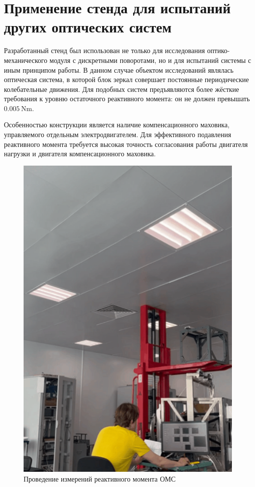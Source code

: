  \section{Применение стенда для испытаний других оптических систем}
 
 Разработанный стенд был использован не только для исследования оптико-механического модуля с дискретными поворотами, но и для испытаний системы с иным принципом работы. В данном случае объектом исследований являлась оптическая система, в которой блок зеркал совершает постоянные периодические колебательные движения. Для подобных систем предъявляются более жёсткие требования к уровню остаточного реактивного момента: он не должен превышать $\SI{0,005}{\newton\meter}$. 
 
 Особенностью конструкции является наличие компенсационного маховика, управляемого отдельным электродвигателем. Для эффективного подавления реактивного момента требуется высокая точность согласования работы двигателя нагрузки и двигателя компенсационного маховика.
 
 \begin{figure}[h!]
 	\centering
 	\includegraphics[scale=0.8]{images/scaner-stand}
 	\caption{Проведение измерений реактивного момента ОМС}
 	\label{fig:scan-stand}
 \end{figure}
 
